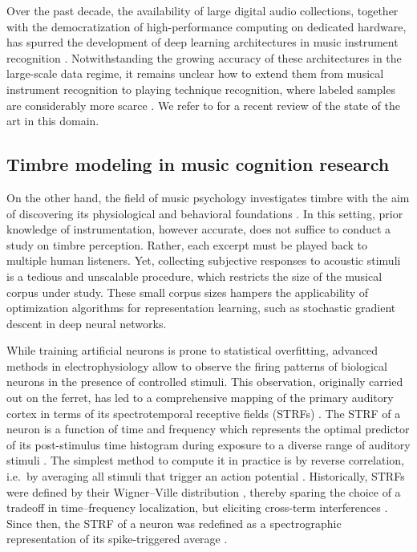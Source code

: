 \documentclass{bmcart}
\begin{document}
Over the past decade, the availability of large digital audio collections, together with the democratization of high-performance computing on dedicated hardware, has spurred the development of deep learning architectures in music instrument recognition \cite{mcfee2015ismir,pons2017eusipco,gururani2018ismir}.
Notwithstanding the growing accuracy of these architectures in the large-scale data regime, it remains unclear how to extend them from musical instrument recognition to playing technique recognition, where labeled samples are considerably more scarce \cite{loureiro2004ismir}.
We refer to \cite{han2017taslp} for a recent review of the state of the art in this domain.

\subsection*{Timbre modeling in music cognition research}
On the other hand, the field of music psychology investigates timbre with the aim of discovering its physiological and behavioral foundations \cite{mcadams2009chapter}.
In this setting, prior knowledge of instrumentation, however accurate, does not suffice to conduct a study on timbre perception.
Rather, each excerpt must be played back to multiple human listeners.
Yet, collecting subjective responses to acoustic stimuli is a tedious and unscalable procedure, which restricts the size of the musical corpus under study.
These small corpus sizes hampers the applicability of optimization algorithms for representation learning, such as stochastic gradient descent in deep neural networks.

While training artificial neurons is prone to statistical overfitting, advanced methods in electrophysiology allow to observe the firing patterns of biological neurons in the presence of controlled stimuli.
This observation, originally carried out on the ferret, has led to a comprehensive mapping of the primary auditory cortex in terms of its spectrotemporal receptive fields (STRFs) \cite{depireux2001jneur}.
The STRF of a neuron is a function of time and frequency which represents the optimal predictor of its post-stimulus time histogram during exposure to a diverse range of auditory stimuli \cite{aertsen1981biolcyb}.
The simplest method to compute it in practice is by reverse correlation, i.e.\ by averaging all stimuli that trigger an action potential \cite{deboer1968biomed}.
Historically, STRFs were defined by their Wigner--Ville distribution \cite{flandrin1998book}, thereby sparing the choice of a tradeoff in time--frequency localization, but eliciting cross-term interferences \cite{eggermont1993hearing}.
Since then, the STRF of a neuron was redefined as a spectrographic representation of its spike-triggered average \cite{klein2000compneur}.
\end{document}
